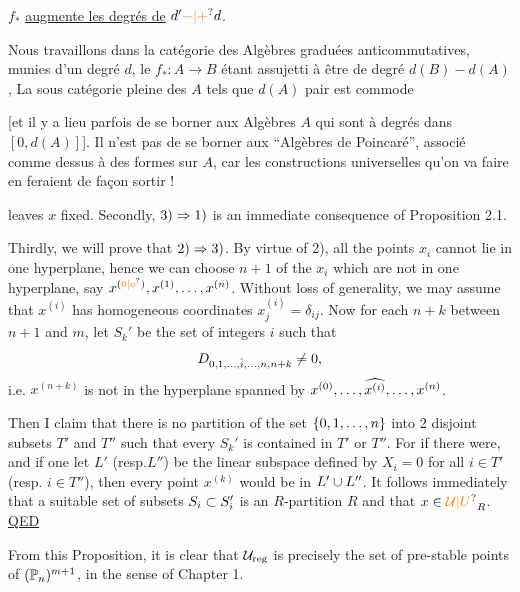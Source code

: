 $f_*$ \uline{augmente les degrés de} $d'\unsure{-|+}d$.

Nous travaillons dans la catégorie  des Algèbres graduées anticommutatives, munies d'un degré $d$, le $f_*:A\to B$ étant assujetti à être de degré $d(B)-d(A)$,  La sous catégorie pleine des $A$ tels que $d(A)$ pair est commode

[et il y a lieu parfois de se borner aux Algèbres $A$ qui sont à degrés  dans $[0,d(A)]$]. Il n'est pas   de se borner aux ``Algèbres de Poincaré'', associé comme dessus à des formes sur $A$, car les constructions universelles qu'on va faire en feraient de  façon sortir !


leaves $x$ fixed. Secondly, $3)\Rightarrow1)$ is an immediate consequence of Proposition 2.1.

Thirdly, we will prove that $2)\Rightarrow3)$. By virtue of 2), all the points $x_i$ cannot lie in one hyperplane, hence we can choose $n+1$ of the $x_i$ which are not in one hyperplane, say $x^{(\unsure{0|o})},x^{(1)},\ldots,x^{(n)}$. Without loss of generality, we may assume that $x^{(i)}$ has homogeneous coordinates $x_j^{(i)}=\delta_{ij}$. Now for each $n+k$ between $n+1$ and $m$, let $S_k'$ be the set of integers $i$ such that
\[
D_{0,1,\ldots,\hat{i},\ldots,n,n+k}\ne0,
\]
i.e. $x^{(n+k)}$ is not in the hyperplane spanned by $x^{(0)},\ldots,\widehat{x^{(i)}},\ldots,x^{(n)}$.

Then I claim that there is no partition of the set $\{0,1,\ldots,n\}$ into 2 disjoint subsets $T'$ and $T''$ such that every $S_k'$ is contained in $T'$ or $T''$. For if there were, and if one let $L'$ (resp.$L''$) be the linear subspace defined by $X_i=0$ for all $i\in T'$ (resp. $i\in T''$), then every point $x^{(k)}$ would be in $L'\cup L''$. It follows immediately that a suitable set of subsets $S_i\subset S_i'$ is an $R$-partition $R$ and that $x\in\handwritten{\unsure{\mathcal U|U}}_R$. \uline{QED}

From this Proposition, it is clear that $\mathcal U_{\mathrm{reg}}$ is precisely the set of pre-stable points of $(\mathbb P_n)^{m+1}$, in the sense of Chapter 1.

